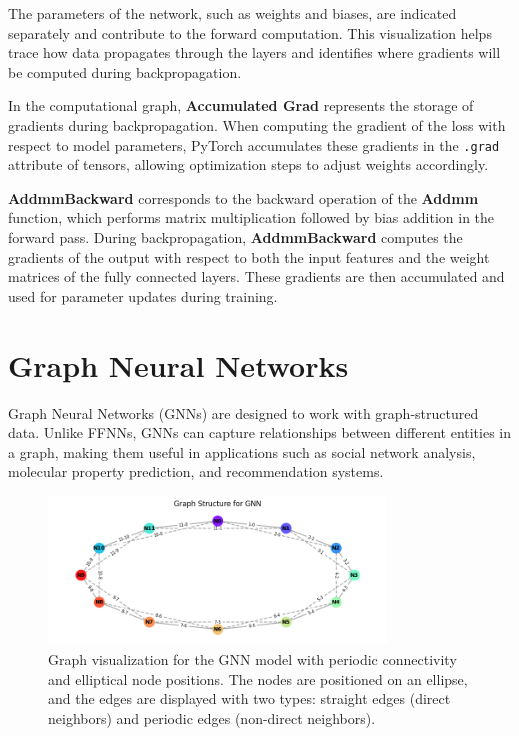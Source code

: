 The parameters of the network, such as weights and biases, are indicated separately and contribute to the forward computation. This visualization helps trace how data propagates through the layers and identifies where gradients will be computed during backpropagation.

In the computational graph, \textbf{Accumulated Grad} represents the storage of gradients during backpropagation. When computing the gradient of the loss with respect to model parameters, PyTorch accumulates these gradients in the \texttt{.grad} attribute of tensors, allowing optimization steps to adjust weights accordingly.

\textbf{AddmmBackward} corresponds to the backward operation of the \textbf{Addmm} function, which performs matrix multiplication followed by bias addition in the forward pass. During backpropagation, \textbf{AddmmBackward} computes the gradients of the output with respect to both the input features and the weight matrices of the fully connected layers. These gradients are then accumulated and used for parameter updates during training.

%
\section{Graph Neural Networks}

Graph Neural Networks (GNNs) are designed to work with graph-structured data. Unlike FFNNs, GNNs can capture relationships between different entities in a graph, making them useful in applications such as social network analysis, molecular property prediction, and recommendation systems.

\begin{figure}[h!]
    \centering
    \includegraphics[width=0.8\textwidth]{images/gnn_graph.png}
    \caption{Graph visualization for the GNN model with periodic connectivity and elliptical node positions. The nodes are positioned on an ellipse, and the edges are displayed with two types: straight edges (direct neighbors) and periodic edges (non-direct neighbors).}
    \label{fig:gnn_graph}
\end{figure}

